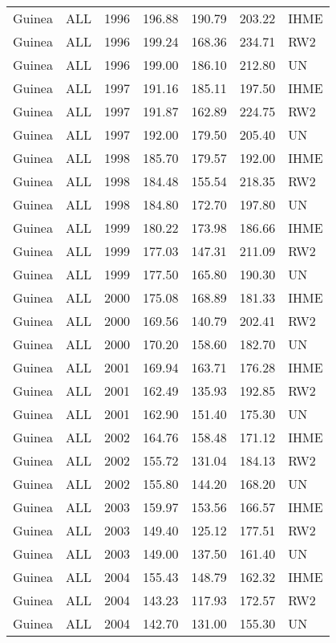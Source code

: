 \begin{longtable}{lllrrrl}
  Guinea & ALL & 1996 & 196.88 & 190.79 & 203.22 & IHME \\ 
  Guinea & ALL & 1996 & 199.24 & 168.36 & 234.71 & RW2 \\ 
  Guinea & ALL & 1996 & 199.00 & 186.10 & 212.80 & UN \\ 
  Guinea & ALL & 1997 & 191.16 & 185.11 & 197.50 & IHME \\ 
  Guinea & ALL & 1997 & 191.87 & 162.89 & 224.75 & RW2 \\ 
  Guinea & ALL & 1997 & 192.00 & 179.50 & 205.40 & UN \\ 
  Guinea & ALL & 1998 & 185.70 & 179.57 & 192.00 & IHME \\ 
  Guinea & ALL & 1998 & 184.48 & 155.54 & 218.35 & RW2 \\ 
  Guinea & ALL & 1998 & 184.80 & 172.70 & 197.80 & UN \\ 
  Guinea & ALL & 1999 & 180.22 & 173.98 & 186.66 & IHME \\ 
  Guinea & ALL & 1999 & 177.03 & 147.31 & 211.09 & RW2 \\ 
  Guinea & ALL & 1999 & 177.50 & 165.80 & 190.30 & UN \\ 
  Guinea & ALL & 2000 & 175.08 & 168.89 & 181.33 & IHME \\ 
  Guinea & ALL & 2000 & 169.56 & 140.79 & 202.41 & RW2 \\ 
  Guinea & ALL & 2000 & 170.20 & 158.60 & 182.70 & UN \\ 
  Guinea & ALL & 2001 & 169.94 & 163.71 & 176.28 & IHME \\ 
  Guinea & ALL & 2001 & 162.49 & 135.93 & 192.85 & RW2 \\ 
  Guinea & ALL & 2001 & 162.90 & 151.40 & 175.30 & UN \\ 
  Guinea & ALL & 2002 & 164.76 & 158.48 & 171.12 & IHME \\ 
  Guinea & ALL & 2002 & 155.72 & 131.04 & 184.13 & RW2 \\ 
  Guinea & ALL & 2002 & 155.80 & 144.20 & 168.20 & UN \\ 
  Guinea & ALL & 2003 & 159.97 & 153.56 & 166.57 & IHME \\ 
  Guinea & ALL & 2003 & 149.40 & 125.12 & 177.51 & RW2 \\ 
  Guinea & ALL & 2003 & 149.00 & 137.50 & 161.40 & UN \\ 
  Guinea & ALL & 2004 & 155.43 & 148.79 & 162.32 & IHME \\ 
  Guinea & ALL & 2004 & 143.23 & 117.93 & 172.57 & RW2 \\ 
  Guinea & ALL & 2004 & 142.70 & 131.00 & 155.30 & UN \\ 

\end{longtable}
